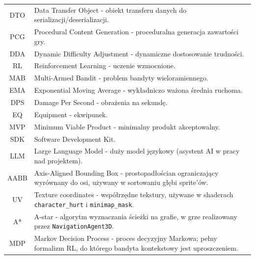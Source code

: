 \begin{longtable}{cp{}}
DTO   & Data Transfer Object - obiekt transferu danych do serializacji/deserializacji. \\
PCG   & Procedural Content Generation - proceduralna generacja zawartości gry. \\
DDA   & Dynamic Difficulty Adjustment - dynamiczne dostosowanie trudności. \\
RL    & Reinforcement Learning - uczenie wzmocnione. \\
MAB   & Multi-Armed Bandit - problem bandyty wieloramiennego. \\
EMA   & Exponential Moving Average - wykładniczo ważona średnia ruchoma. \\
DPS   & Damage Per Second - obrażenia na sekundę. \\
EQ    & Equipment - ekwipunek. \\
MVP   & Minimum Viable Product - minimalny produkt akceptowalny. \\
SDK   & Software Development Kit. \\
LLM   & Large Language Model - duży model językowy (asystent AI w pracy nad projektem). \\
AABB  & Axis-Aligned Bounding Box - prostopadłościan ograniczający wyrównany do osi, używany w sortowaniu głębi sprite'ów. \\
UV    & Texture coordinates - współrzędne tekstury, używane w shaderach \texttt{character\_hurt} i \texttt{minimap\_mask}. \\
A*    & A-star - algorytm wyznaczania ścieżki na grafie, w grze realizowany przez \texttt{NavigationAgent3D}. \\
MDP   & Markov Decision Process - proces decyzyjny Markowa; pełny formalizm RL, do którego bandyta kontekstowy jest uproszczeniem. \\

\end{longtable}
